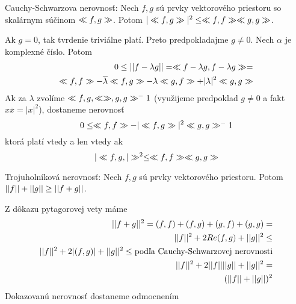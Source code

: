 \begin{veta}
    Cauchy-Schwarzova nerovnosť:
    Nech $f,g$ sú prvky vektorového priestoru so skalárnym súčinom
    $\ll f,g \gg$.
    Potom $|\ll f,g \gg|^2 \le \ll f,f \gg \ll g,g \gg$.
\end{veta}
\begin{dokaz}
    Ak $g=0$, tak tvrdenie triviálne platí. Preto predpokladajme
    $g\not=0$. Nech $\alpha$ je komplexné číslo. Potom
    \begin{align}
        0\le ||f-\lambda g|| = \ll f-\lambda g,f-\lambda g \gg =
        \\
        \ll f,f \gg - \overline{\lambda}\ll f,g \gg -
        \lambda \ll g,f \gg + |\lambda|^2 \ll g,g \gg
    \end{align}
    Ak za $\lambda$ zvolíme $\ll f,g,\ll \gg,g,g \gg^-1$ (využijeme
    predpoklad $g\not=0$ a fakt $x\overline{x} = |x|^2$), dostaneme nerovnosť
    \begin{equation}
        0\le \ll f,f \gg - |\ll f,g \gg|^2 \ll g,g \gg^-1
    \end{equation}
    ktorá platí vtedy a len vtedy ak
    \begin{equation}
        |\ll f,g,| \gg^2 \le \ll f,f \gg \ll g,g \gg
    \end{equation}
\end{dokaz}

\begin{lema}
    Trojuholníková nerovnosť: Nech $f,g$ sú prvky vektorového
    priestoru. Potom $||f||+||g|| \ge ||f+g||$.
\end{lema}
\begin{dokaz}
    Z dôkazu pytagorovej vety máme
    \begin{align}
        ||f+g||^2 = ( f,f ) + ( f,g ) + ( g,f ) +
        ( g,g ) =  \\
        ||f||^2 + 2Re( f,g ) + ||g||^2 \le \\
        ||f||^2 + 2|( f,g )| + ||g||^2 \le 
        \text{podľa Cauchy-Schwarzovej nerovnosti}\\
        ||f||^2 + 2||f||||g|| + ||g||^2 = \\
        (||f|| + ||g||)^2
    \end{align}
    Dokazovanú nerovnosť dostaneme odmocnením 
\end{dokaz}



